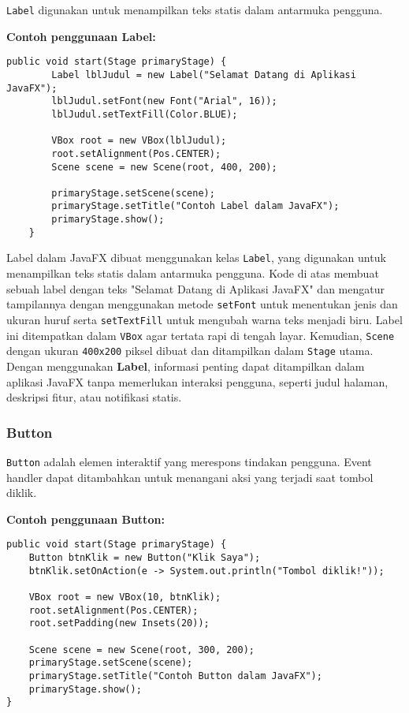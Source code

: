 \texttt{Label} digunakan untuk menampilkan teks statis dalam antarmuka pengguna. 

\textbf{Contoh penggunaan Label:}
\begin{lstlisting}[style=JavaStyle, caption=Membuat Label dalam JavaFX]
	public void start(Stage primaryStage) {
		Label lblJudul = new Label("Selamat Datang di Aplikasi JavaFX");
		lblJudul.setFont(new Font("Arial", 16));
		lblJudul.setTextFill(Color.BLUE);
		
		VBox root = new VBox(lblJudul);
		root.setAlignment(Pos.CENTER);
		Scene scene = new Scene(root, 400, 200);
		
		primaryStage.setScene(scene);
		primaryStage.setTitle("Contoh Label dalam JavaFX");
		primaryStage.show();
	}
\end{lstlisting}

Label dalam JavaFX dibuat menggunakan kelas \texttt{Label}, yang digunakan untuk menampilkan teks statis dalam antarmuka pengguna. Kode di atas membuat sebuah label dengan teks "Selamat Datang di Aplikasi JavaFX" dan mengatur tampilannya dengan menggunakan metode \texttt{setFont} untuk menentukan jenis dan ukuran huruf serta \texttt{setTextFill} untuk mengubah warna teks menjadi biru. Label ini ditempatkan dalam \texttt{VBox} agar tertata rapi di tengah layar. Kemudian, \texttt{Scene} dengan ukuran \texttt{400x200} piksel dibuat dan ditampilkan dalam \texttt{Stage} utama. Dengan menggunakan \textbf{Label}, informasi penting dapat ditampilkan dalam aplikasi JavaFX tanpa memerlukan interaksi pengguna, seperti judul halaman, deskripsi fitur, atau notifikasi statis.


\subsubsection{Button}

\texttt{Button} adalah elemen interaktif yang merespons tindakan pengguna. Event handler dapat ditambahkan untuk menangani aksi yang terjadi saat tombol diklik.

\textbf{Contoh penggunaan Button:}
\begin{lstlisting}[style=JavaStyle, caption=Membuat Button dan Menangani Event]
public void start(Stage primaryStage) {
	Button btnKlik = new Button("Klik Saya");
	btnKlik.setOnAction(e -> System.out.println("Tombol diklik!"));
	
	VBox root = new VBox(10, btnKlik);
	root.setAlignment(Pos.CENTER);
	root.setPadding(new Insets(20));
	
	Scene scene = new Scene(root, 300, 200);
	primaryStage.setScene(scene);
	primaryStage.setTitle("Contoh Button dalam JavaFX");
	primaryStage.show();
}
\end{lstlisting}

